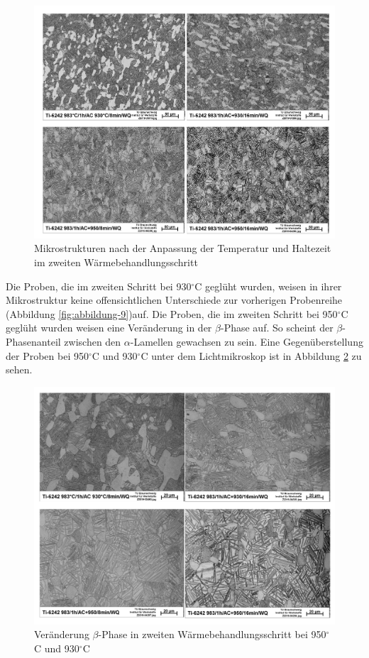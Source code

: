 \begin{figure}
	\centering
	\includegraphics[width=0.9\linewidth]{./Bilder/Abbildung 14}
	\caption[Abbildung 14]{Mikrostrukturen nach der Anpassung der Temperatur und Haltezeit im zweiten Wärmebehandlungsschritt}
	\label{fig:abbildung-14}
\end{figure}

Die Proben, die im zweiten Schritt bei 930$^\circ$C geglüht wurden, weisen in ihrer Mikrostruktur keine offensichtlichen Unterschiede zur vorherigen Probenreihe (Abbildung \ref{fig:abbildung-9})auf. Die Proben, die im zweiten Schritt bei 950$^\circ$C geglüht wurden weisen eine Veränderung in der $\beta$-Phase auf. So scheint der $\beta$-Phasenanteil zwischen den $\alpha$-Lamellen gewachsen zu sein. Eine Gegenüberstellung der Proben bei 950$^\circ$C und 930$^\circ$C unter dem Lichtmikroskop ist in Abbildung \ref{fig:abbildung-15} zu sehen.

\begin{figure}
	\centering
	\includegraphics[width=0.9\linewidth]{./Bilder/Abbildung 15}
	\caption[Abbildung 15]{Veränderung $\beta$-Phase in zweiten Wärmebehandlungsschritt bei 950$^\circ$C und 930$^\circ$C}
	\label{fig:abbildung-15}
\end{figure}

